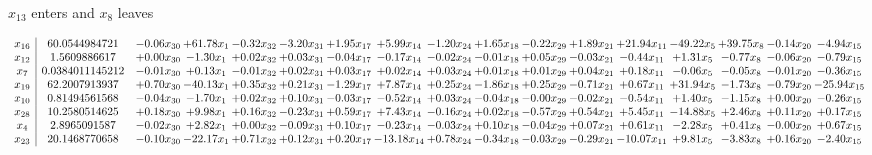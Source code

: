 \documentclass[9pt]{article}
\begin{document}
 $ x_{13} $ enters and $ x_{8} $ leaves 

 \[\begin{array}{c| c c@{\hskip 2pt} c@{\hskip 2pt} c@{\hskip 2pt} c@{\hskip 2pt} c@{\hskip 2pt} c@{\hskip 2pt} c@{\hskip 2pt} c@{\hskip 2pt} c@{\hskip 2pt} c@{\hskip 2pt} c@{\hskip 2pt} c@{\hskip 2pt} c@{\hskip 2pt} c@{\hskip 2pt} c@{\hskip 2pt} }
 x_{16}   &  60.0544984721 & -0.06 x_{30} & + 61.78 x_{1} & -0.32 x_{32} & -3.20 x_{31} & +  1.95 x_{17} & +  5.99 x_{14} & -1.20 x_{24} & +  1.65 x_{18} & -0.22 x_{29} & +  1.89 x_{21} & + 21.94 x_{11} & -49.22 x_{5} & + 39.75 x_{8} & -0.14 x_{20} & -4.94 x_{15}\\
 x_{12}   &  1.5609886617 & +  0.00 x_{30} & -1.30 x_{1} & +  0.02 x_{32} & +  0.03 x_{31} & -0.04 x_{17} & -0.17 x_{14} & -0.02 x_{24} & -0.01 x_{18} & +  0.05 x_{29} & -0.03 x_{21} & -0.44 x_{11} & +  1.31 x_{5} & -0.77 x_{8} & -0.06 x_{20} & -0.79 x_{15}\\
 x_{7}   &  0.0384011145212 & -0.01 x_{30} & +  0.13 x_{1} & -0.01 x_{32} & +  0.02 x_{31} & +  0.03 x_{17} & +  0.02 x_{14} & +  0.03 x_{24} & +  0.01 x_{18} & +  0.01 x_{29} & +  0.04 x_{21} & +  0.18 x_{11} & -0.06 x_{5} & -0.05 x_{8} & -0.01 x_{20} & -0.36 x_{15}\\
 x_{19}   &  62.2007913937 & +  0.70 x_{30} & -40.13 x_{1} & +  0.35 x_{32} & +  0.21 x_{31} & -1.29 x_{17} & +  7.87 x_{14} & +  0.25 x_{24} & -1.86 x_{18} & +  0.25 x_{29} & -0.71 x_{21} & +  0.67 x_{11} & + 31.94 x_{5} & -1.73 x_{8} & -0.79 x_{20} & -25.94 x_{15}\\
 x_{10}   &  0.81494561568 & -0.04 x_{30} & -1.70 x_{1} & +  0.02 x_{32} & +  0.10 x_{31} & -0.03 x_{17} & -0.52 x_{14} & +  0.03 x_{24} & -0.04 x_{18} & -0.00 x_{29} & -0.02 x_{21} & -0.54 x_{11} & +  1.40 x_{5} & -1.15 x_{8} & +  0.00 x_{20} & -0.26 x_{15}\\
 x_{28}   &  10.2580514625 & +  0.18 x_{30} & +  9.98 x_{1} & +  0.16 x_{32} & -0.23 x_{31} & +  0.59 x_{17} & +  7.43 x_{14} & -0.16 x_{24} & +  0.02 x_{18} & -0.57 x_{29} & +  0.54 x_{21} & +  5.45 x_{11} & -14.88 x_{5} & +  2.46 x_{8} & +  0.11 x_{20} & +  0.17 x_{15}\\
 x_{4}   &  2.8965091587 & -0.02 x_{30} & +  2.82 x_{1} & +  0.00 x_{32} & -0.09 x_{31} & +  0.10 x_{17} & -0.23 x_{14} & -0.03 x_{24} & +  0.10 x_{18} & -0.04 x_{29} & +  0.07 x_{21} & +  0.61 x_{11} & -2.28 x_{5} & +  0.41 x_{8} & -0.00 x_{20} & +  0.67 x_{15}\\
 x_{23}   &  20.1468770658 & -0.10 x_{30} & -22.17 x_{1} & +  0.71 x_{32} & +  0.12 x_{31} & +  0.20 x_{17} & -13.18 x_{14} & +  0.78 x_{24} & -0.34 x_{18} & -0.03 x_{29} & -0.29 x_{21} & -10.07 x_{11} & +  9.81 x_{5} & -3.83 x_{8} & +  0.16 x_{20} & -2.40 x_{15}\\

\end{array}\]
\end{document}
